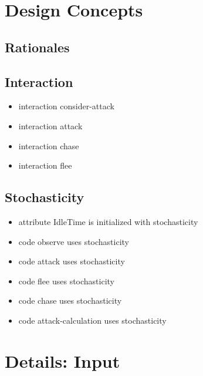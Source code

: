 \documentclass{article}
\begin{document}
\section{Design Concepts}                               
\subsection{Rationales}                          
\subsection{Interaction}
\begin{itemize}
    \item interaction consider-attack                    
    \item interaction attack                       
    \item interaction chase                                
    \item interaction flee
\end{itemize}                          
\subsection{Stochasticity}
\begin{itemize}
    \item attribute IdleTime is initialized with stochasticity
    \item code observe uses stochasticity
    \item code attack uses stochasticity                   
    \item code flee uses stochasticity
    \item code chase uses stochasticity
    \item code attack-calculation uses stochasticity
\end{itemize}

\section{Details: Input}                           
\end{document}
